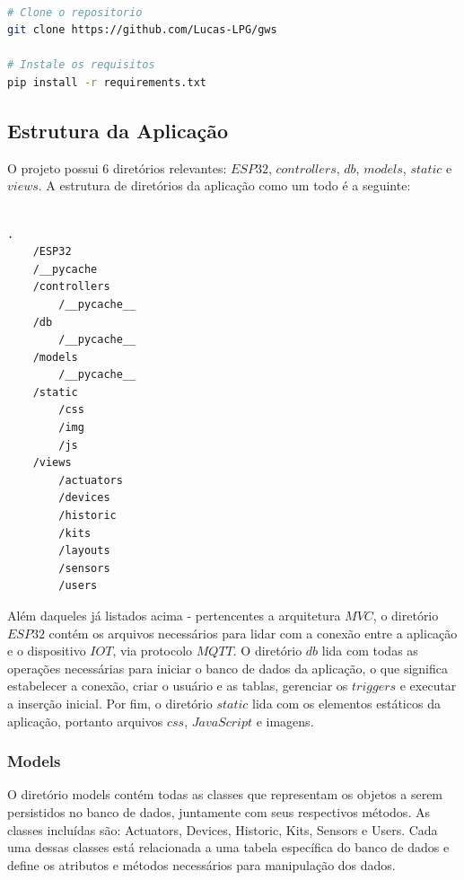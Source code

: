 \documentclass[conference, a4paper, 12pt]{IEEEtran}
\begin{document}
\begin{lstlisting}[language=bash, caption=Project Setup]

# Clone o repositorio
git clone https://github.com/Lucas-LPG/gws

# Instale os requisitos
pip install -r requirements.txt

\end{lstlisting}

\subsection{Estrutura da Aplicação}
O projeto possui 6 diretórios relevantes: $ESP32$, $controllers$, $db$, $models$, $static$ e $views$. A estrutura de diretórios da aplicação como um todo é a seguinte:


\begin{lstlisting}[caption=Estrutura dos Diretórios]

.
    /ESP32
    /__pycache
    /controllers
        /__pycache__
    /db
        /__pycache__
    /models
        /__pycache__
    /static
        /css
        /img
        /js
    /views
        /actuators
        /devices
        /historic
        /kits
        /layouts
        /sensors
        /users

\end{lstlisting}

Além daqueles já listados acima - pertencentes a arquitetura $MVC$, o diretório $ESP32$ contém os arquivos necessários para lidar com a conexão entre a aplicação e o dispositivo $IOT$, via protocolo $MQTT$. O diretório $db$ lida com todas as operações necessárias para iniciar o banco de dados da aplicação, o que significa estabelecer a conexão, criar o usuário e as tablas, gerenciar os $triggers$ e executar a inserção inicial. Por fim, o diretório $static$ lida com os elementos estáticos da aplicação, portanto arquivos $css$, $JavaScript$ e imagens.

\subsubsection{Models}
O diretório models contém todas as classes que representam os objetos a serem persistidos no banco de dados, juntamente com seus respectivos métodos. As classes incluídas são: Actuators, Devices, Historic, Kits, Sensors e Users. Cada uma dessas classes está relacionada a uma tabela específica do banco de dados e define os atributos e métodos necessários para manipulação dos dados.
\end{document}
